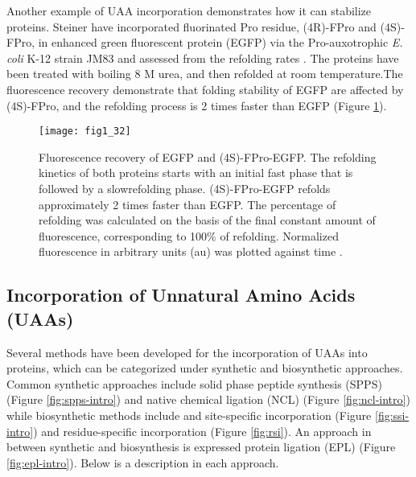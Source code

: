 \begin{refsection}
Another example of UAA incorporation demonstrates how it can stabilize
proteins. Steiner  have incorporated fluorinated Pro residue,
(4R)-FPro and (4S)-FPro, in enhanced green fluorescent protein (EGFP) via the
Pro-auxotrophic \emph{E. coli} K-12 strain JM83 and assessed from the refolding
rates \cite{Steiner2008}. The proteins have been treated with boiling 8 M urea,
and then refolded at room temperature.The fluorescence recovery demonstrate
that folding stability of EGFP are affected by (4S)-FPro, and the refolding
process is 2 times faster than EGFP (Figure \ref{fig:budisa}).
\begin{figure}[htbp] \centering \texttt{[image: fig1\_32]} 
    \caption[Fluorescence recovery of EGFP and (4S)-FPro-EGFP. The refolding
    kinetics of both proteins starts with an initial fast phase that is
followed by a slowrefolding phase. (4S)-FPro-EGFP refolds approximately 2 times
faster than EGFP. The percentage of refolding was calculated on the basis of
the final constant amount of fluorescence, corresponding to 100\% of refolding.
Normalized fluorescence in arbitrary units (au) was plotted against
time.]{Fluorescence recovery of EGFP and (4S)-FPro-EGFP. The refolding kinetics
    of both proteins starts with an initial fast phase that is followed by a
    slowrefolding phase. (4S)-FPro-EGFP refolds approximately 2 times faster
    than EGFP. The percentage of refolding was calculated on the basis of the
    final constant amount of fluorescence, corresponding to 100\% of refolding.
    Normalized fluorescence in arbitrary units (au) was plotted against time
    \cite{Steiner2008}.}
    \label{fig:budisa}
\end{figure}

\subsection{Incorporation of Unnatural Amino Acids (UAAs)} 
\label{sec:rsi-intro}

Several methods have been developed for the incorporation of UAAs into
proteins, which can be categorized under synthetic and biosynthetic approaches.
Common synthetic approaches include solid phase peptide synthesis (SPPS)
(Figure \ref{fig:spps-intro}) and native chemical ligation (NCL) (Figure
\ref{fig:ncl-intro}) while biosynthetic methods include  and
 site-specific incorporation \cite{Cellitti2008,Hassan2008}
(Figure \ref{fig:ssi-intro}) and residue-specific incorporation
\cite{Johnson2010} (Figure \ref{fig:rsi}). An approach in between synthetic and
biosynthesis is expressed protein ligation (EPL) \cite{Muir1998} (Figure
\ref{fig:epl-intro}). Below is a description in each approach.


\end{refsection}
